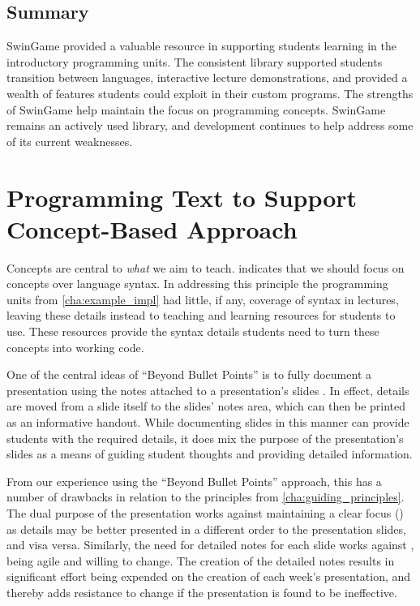 

\subsection{Summary} %
\label{sub:swingame_summary}

SwinGame provided a valuable resource in supporting students learning in the introductory programming units. The consistent library supported students transition between languages, interactive lecture demonstrations, and provided a wealth of features students could exploit in their custom programs. The strengths of SwinGame help maintain the focus on programming concepts. SwinGame remains an actively used library, and development continues to help address some of its current weaknesses.






\clearpage
\section{Programming Text to Support Concept-Based Approach} %
\label{sec:arcana}

Concepts are central to \emph{what} we aim to teach.  indicates that we should focus on concepts over language syntax. In addressing this principle the programming units from \cref{cha:example_impl} had little, if any, coverage of syntax in lectures, leaving these details instead to teaching and learning resources for students to use. These resources provide the syntax details students need to turn these concepts into working code.

One of the central ideas of ``Beyond Bullet Points'' is to fully document a presentation using the notes attached to a presentation's slides \cite{Atkinson:2007}. In effect, details are moved from a slide itself to the slides' notes area, which can then be printed as an informative handout. While documenting slides in this manner can provide students with the required details, it does mix the purpose of the presentation's slides as a means of guiding student thoughts and providing detailed information.

From our experience using the ``Beyond Bullet Points'' approach, this has a number of drawbacks in relation to the principles from \cref{cha:guiding_principles}. The dual purpose of the presentation works against maintaining a clear focus () as details may be better presented in a different order to the presentation slides, and visa versa. Similarly, the need for detailed notes for each slide works against , being agile and willing to change. The creation of the detailed notes results in significant effort being expended on the creation of each week's presentation, and thereby adds resistance to change if the presentation is found to be ineffective. 

